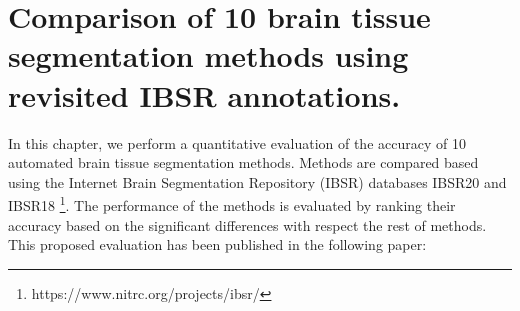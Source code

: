 
\chapter{Comparison of 10 brain tissue segmentation methods using revisited IBSR annotations.}  
\label{chapter:chapter_2}

In this chapter, we perform a quantitative evaluation of the accuracy of 10 automated brain tissue segmentation methods. Methods are compared based using the Internet Brain Segmentation Repository (IBSR) databases IBSR20 and IBSR18 \footnote{https://www.nitrc.org/projects/ibsr/}. The performance of the methods is evaluated by ranking their accuracy based on the significant differences with respect the rest of methods. This proposed evaluation has been published in the following paper:

\vspace{2cm}

\noindent{}
%




